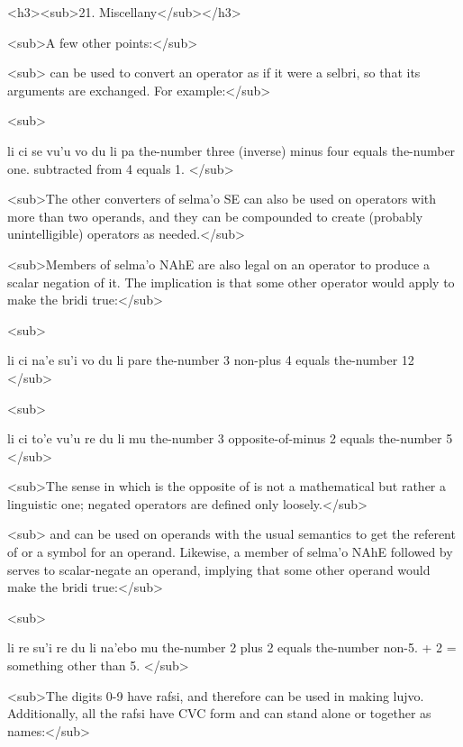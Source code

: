 <h3><sub>21. Miscellany</sub></h3>

<sub>A few other points:</sub>

<sub> can be used to convert an operator as if it were
    a selbri, so that its arguments are exchanged. For
    example:</sub>

<sub>
\begin{example}
li ci se vu'u vo\n
\T	du li pa\n
the-number three (inverse) minus four\n
\T	equals the-number one. subtracted from 4 equals 1.
</sub>
\end{example}

<sub>The other converters of selma'o SE can also be used on
    operators with more than two operands, and they can be
    compounded to create (probably unintelligible) operators as
    needed.</sub>

<sub>Members of selma'o NAhE are also legal on an operator
    to produce a scalar negation of it. The implication is that
    some other operator would apply to make the bridi
    true:</sub>

<sub>
\begin{example}
li ci na'e su'i vo du li pare\n
the-number 3 non-plus 4 equals the-number 12
</sub>
\end{example}

<sub>
\begin{example}
li ci to'e vu'u re du li mu\n
the-number 3 opposite-of-minus 2 equals the-number 5
</sub>
\end{example}

<sub>The sense in which  is the opposite of
     is not a mathematical but rather a linguistic one;
    negated operators are defined only loosely.</sub>

<sub> and  can be used on operands with the
    usual semantics to get the referent of or a symbol for an
    operand. Likewise, a member of selma'o NAhE followed by 
    serves to scalar-negate an operand, implying that some other
    operand would make the bridi true:</sub>

<sub>
\begin{example}
li re su'i re du li na'ebo mu\n
the-number 2 plus 2 equals the-number non-5. + 2 = something other than 5.
</sub>
\end{example}

<sub>The digits 0-9 have rafsi, and therefore can be used in
    making lujvo. Additionally, all the rafsi have CVC form and can
    stand alone or together as names:</sub>

